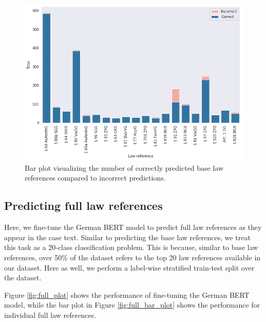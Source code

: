 \documentclass[sigconf]{acmart}
\begin{document}
\begin{figure}[h]
	\centering
	\includegraphics[width=1\linewidth]{latex/base_correct.png}
	\caption{Bar plot visualizing the number of correctly predicted base law references compared to incorrect predictions.}
	\label{fig:base_bar_plot}
\end{figure}

\subsection{Predicting full law references}

Here, we fine-tune the German BERT model to predict full law references as they appear in the case text. Similar to predicting the base law references, we treat this task as a 20-class classification problem. This is because, similar to base law references, over 50\% of the dataset refers to the top 20 law references available in our dataset. Here as well, we perform a label-wise stratified train-test split over the dataset.

Figure \ref{fig:full_plot} shows the performance of fine-tuning the German BERT model, while the bar plot in Figure \ref{fig:full_bar_plot} shows the performance for individual full law references.
\end{document}

